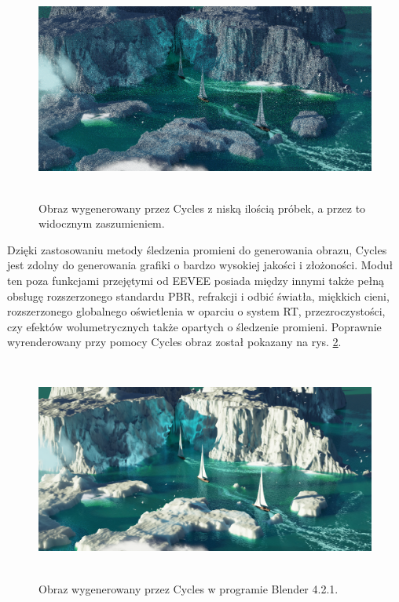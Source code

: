 \begin{itemize}
	\vfill
	\clearpage

	\begin{figure}[htbp]
		\centering
		\includegraphics[width=5.81975in,height=2.875in]{images/15_cycles_low_samples.png}
		\caption{Obraz wygenerowany przez Cycles z niską ilością próbek, a przez to widocznym zaszumieniem.}
		\label{intro-cycles-low}
	\end{figure}

	Dzięki zastosowaniu metody śledzenia promieni do generowania obrazu, Cycles jest zdolny do generowania grafiki o bardzo wysokiej jakości i złożoności. Moduł ten poza funkcjami przejętymi od EEVEE posiada między innymi także pełną obsługę rozszerzonego standardu PBR, refrakcji i odbić światła, miękkich cieni, rozszerzonego globalnego oświetlenia w oparciu o system RT, przezroczystości, czy efektów wolumetrycznych także opartych o śledzenie promieni. Poprawnie wyrenderowany przy pomocy Cycles obraz został pokazany na rys. \ref{intro-cycles-high}.

	\begin{figure}[htbp]
		\centering
		\includegraphics[width=5.81974in,height=2.875in]{images/16_high_samples.png}
		\caption{Obraz wygenerowany przez Cycles w programie Blender 4.2.1.}
		\label{intro-cycles-high}
	\end{figure}


\end{itemize}
